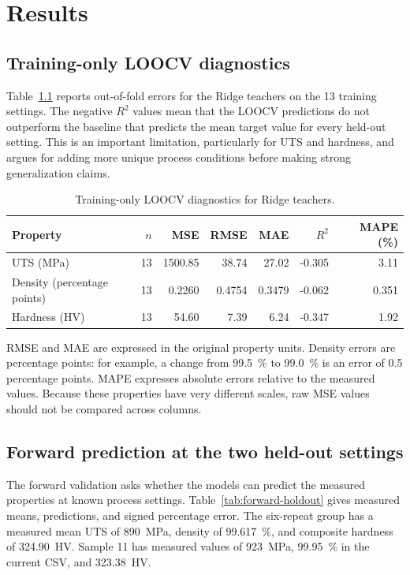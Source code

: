 \documentclass[12pt,a4paper,oneside]{report}
\begin{document}
\chapter{Results}

\section{Training-only LOOCV diagnostics}
Table~\ref{tab:loocv} reports out-of-fold errors for the Ridge teachers on the 13 training settings. The negative $R^2$ values mean that the LOOCV predictions do not outperform the baseline that predicts the mean target value for every held-out setting. This is an important limitation, particularly for UTS and hardness, and argues for adding more unique process conditions before making strong generalization claims.

\begin{table}[H]
\centering
\caption{Training-only LOOCV diagnostics for Ridge teachers.}
\label{tab:loocv}
\begin{tabular}{lrrrrrr}
\toprule
Property & $n$ & MSE & RMSE & MAE & $R^2$ & MAPE (\%)\\
\midrule
UTS (MPa) & 13 & 1500.85 & 38.74 & 27.02 & -0.305 & 3.11\\
Density (percentage points) & 13 & 0.2260 & 0.4754 & 0.3479 & -0.062 & 0.351\\
Hardness (HV) & 13 & 54.60 & 7.39 & 6.24 & -0.347 & 1.92\\
\bottomrule
\end{tabular}
\end{table}

RMSE and MAE are expressed in the original property units. Density errors are percentage points: for example, a change from \SI{99.5}{\percent} to \SI{99.0}{\percent} is an error of 0.5 percentage points. MAPE expresses absolute errors relative to the measured values. Because these properties have very different scales, raw MSE values should not be compared across columns.

\section{Forward prediction at the two held-out settings}
The forward validation asks whether the models can predict the measured properties at known process settings. Table~\ref{tab:forward-holdout} gives measured means, predictions, and signed percentage error. The six-repeat group has a measured mean UTS of \SI{890}{MPa}, density of \SI{99.617}{\percent}, and composite hardness of \SI{324.90}{HV}. Sample 11 has measured values of \SI{923}{MPa}, \SI{99.95}{\percent} in the current CSV, and \SI{323.38}{HV}.
\end{document}
